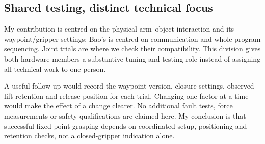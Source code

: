 \subsection{Shared testing, distinct technical focus}
My contribution is centred on the physical arm--object interaction and its waypoint/gripper settings; Bao's is centred on communication and whole-program sequencing. Joint trials are where we check their compatibility. This division gives both hardware members a substantive tuning and testing role instead of assigning all technical work to one person.

A useful follow-up would record the waypoint version, closure settings, observed lift retention and release position for each trial. Changing one factor at a time would make the effect of a change clearer. No additional fault tests, force measurements or safety qualifications are claimed here. My conclusion is that successful fixed-point grasping depends on coordinated setup, positioning and retention checks, not a closed-gripper indication alone.
\githubsection
{}

